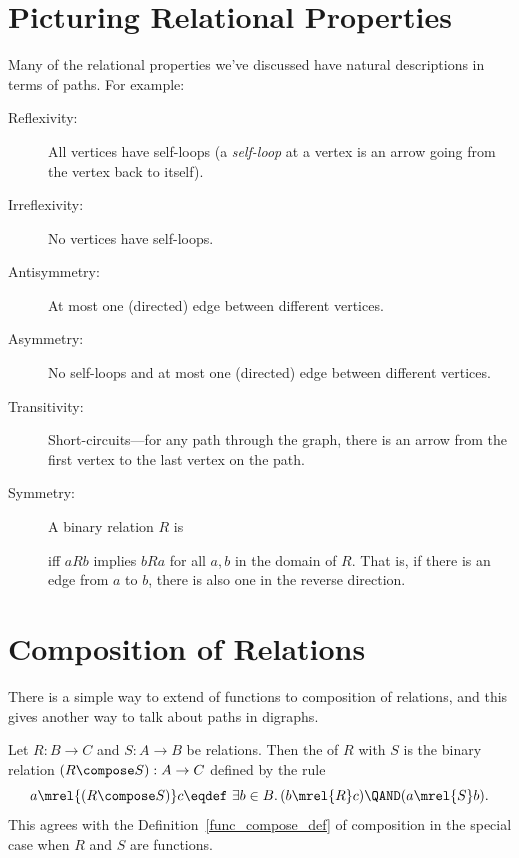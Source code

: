 \section{Picturing Relational Properties}

Many of the relational properties we've discussed have natural
descriptions in terms of paths.  For example:
\begin{description}

\item[Reflexivity:] All vertices have self-loops (a \emph{self-loop} at a
vertex is an arrow going from the vertex back to itself).

\item[Irreflexivity:] No vertices have self-loops.

\item[Antisymmetry:] At most one (directed) edge between different
  vertices.

\item[Asymmetry:] No self-loops and at most one (directed) edge
  between different vertices.

\item[Transitivity:] Short-circuits---for any path through the graph,
there is an arrow from the first vertex to the last vertex on the path.

\item[Symmetry:] A binary relation $R$ is
   iff $aRb$ implies
  $bRa$ for all $a,b$ in the domain of $R$.  That is, if there is an
  edge from $a$ to $b$, there is also one in the reverse direction.

\end{description}

\section{Composition of Relations}\label{relation_compose_subsec}

There is a simple way to extend  of functions to
composition of relations, and this gives another way to talk about
paths in digraphs.

Let $R: B\to C$ and $S: A \to B$ be relations.  Then the
 of $R$ with $S$ is the binary relation $(R \compose
S): A\to C$ defined by the rule
\[
a \mrel{(R \compose S)} c \eqdef\ \exists b \in B.\, (b \mrel{R} c)
\QAND (a \mrel{S} b).
\]
This agrees with the Definition~\ref{func_compose_def} of composition
in the special case when $R$ and $S$ are functions.

